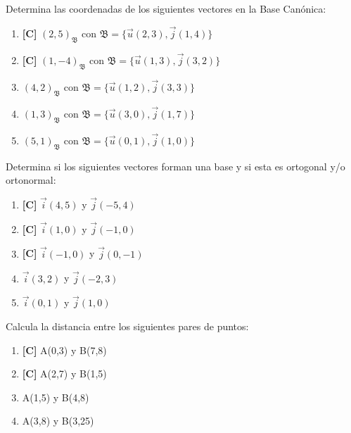 \Exercicio Determina las coordenadas de los siguientes vectores en la Base Canónica:

\begin{enumerate}[topsep=0pt]
	\item \textbf{[C]} $ (2,5)_\mathfrak{\mathfrak{B}} $ con $\mathfrak{B} = \{\overrightarrow{u}(2,3), \overrightarrow{j}(1,4) \} $
	\item \textbf{[C]} $ (1,-4)_\mathfrak{B} $ con $\mathfrak{B} = \{\overrightarrow{u}(1,3), \overrightarrow{j}(3,2) \} $
	
	\item $ (4,2)_\mathfrak{B} $ con $\mathfrak{B} = \{\overrightarrow{u}(1,2), \overrightarrow{j}(3,3) \} $
	\item $ (1,3)_\mathfrak{B} $ con $\mathfrak{B} = \{\overrightarrow{u}(3,0), \overrightarrow{j}(1,7) \} $
	\item $ (5,1)_\mathfrak{B} $ con $\mathfrak{B} = \{\overrightarrow{u}(0,1), \overrightarrow{j}(1,0) \} $
\end{enumerate}


\Exercicio Determina si los siguientes vectores forman una base y si esta es ortogonal y/o ortonormal:

\begin{enumerate}[topsep=0pt]
	\item \textbf{[C]} $ \overrightarrow{i}(4,5)$ y $\overrightarrow{j}(-5,4) $
	\item \textbf{[C]} $ \overrightarrow{i}(1,0)$ y $\overrightarrow{j}(-1,0) $
	\item \textbf{[C]} $ \overrightarrow{i}(-1,0)$ y $\overrightarrow{j}(0,-1) $
	
	\item $ \overrightarrow{i}(3,2)$ y $\overrightarrow{j}(-2,3) $
	\item $ \overrightarrow{i}(0,1)$ y $\overrightarrow{j}(1,0) $
\end{enumerate}


\Exercicio Calcula la distancia entre los siguientes pares de puntos:

\begin{enumerate}[topsep=0pt]
	\item \textbf{[C]} A(0,3) y B(7,8)
	\item \textbf{[C]} A(2,7) y B(1,5)
	
	\item A(1,5) y B(4,8)
	\item A(3,8) y B(3,25)
	
\end{enumerate}


